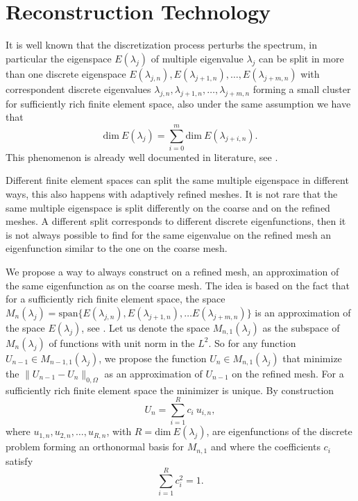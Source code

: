 \documentclass[preprint,12pt]{elsarticle}
\begin{document}
 



\section{Reconstruction Technology}\label{sec:reco}

It is well known that the discretization process perturbs the spectrum, in particular the eigenspace $E(\lambda_j)$ of multiple eigenvalue $\lambda_j$ can be split in more than one discrete eigenspace $E(\lambda_{j,n}),E(\lambda_{j+1,n}),\dots,E(\lambda_{j+m,n})$ with correspondent discrete eigenvalues $\lambda_{j,n},\lambda_{j+1,n},\dots,\lambda_{j+m,n}$ forming a small cluster for sufficiently rich finite element space, also under the same assumption we have that
$$
\mathrm{dim}\ E(\lambda_j)=\sum_{i=0}^m\mathrm{dim}\ E(\lambda_{j+i,n}).
$$
This phenomenon is already well documented in literature,  see \cite{strang, babuska, hackbusch}.

Different finite element spaces can split the same multiple eigenspace in different ways, this also happens with adaptively refined meshes. It is not rare that the same multiple eigenspace is split differently on the coarse and on the refined meshes. A different split corresponds to different discrete eigenfunctions, then it is not always possible to find for the same eigenvalue on the refined mesh an eigenfunction similar to the one on the coarse mesh.


We propose a way to always construct on a refined mesh, an approximation of the same eigenfunction as on the coarse mesh. The idea is based on the fact that for a sufficiently rich finite element space, the space $M_n(\lambda_j)=\mathrm{span}\{E(\lambda_{j,n}),E(\lambda_{j+1,n}),\dots E(\lambda_{j+m,n})\}$ is an approximation of the space $E(\lambda_j)$, see \cite{strang}. Let us denote the space $M_{n,1}(\lambda_j)$ as the subspace of $M_n(\lambda_j)$ of functions with unit norm in the $L^2$.
So for any function $U_{n-1}\in M_{n-1,1}(\lambda_j)$, we propose the function $U_{n}\in M_{n,1}(\lambda_j)$ that minimize the $\|U_{n-1}-U_{n}\|_{0,\Omega}$ as an approximation of $U_{n-1}$ on the refined mesh. For a sufficiently rich finite element space the minimizer is unique. By construction
\begin{equation}\label{eq:const}
U_n=\sum_{i=1}^{R} c_i \ u_{i,n},
\end{equation}
where $u_{1,n},u_{2,n},\dots,u_{R,n}$, with $R=\mathrm{dim}\ E(\lambda_j)$, are eigenfunctions of the discrete problem forming  an orthonormal basis for
$M_{n,1}$ and where the coefficients $c_i$ satisfy 
\begin{equation}\label{eq:cond_on_corf}
\sum_{i=1}^{R} c_i^2=1.
\end{equation}
\end{document}
